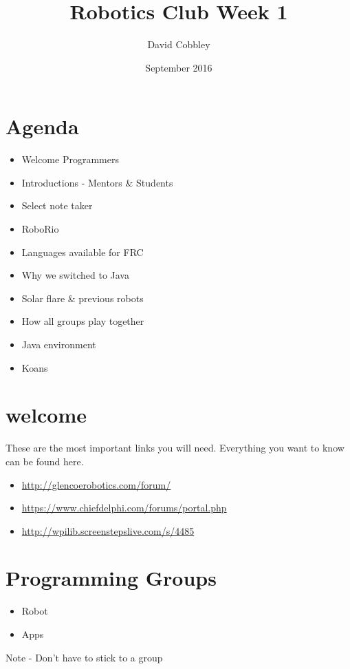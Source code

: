 \documentclass{article}
\title{Robotics Club Week 1}
\author{David Cobbley }
\date{September 2016}
\begin{document}
\maketitle

\section{Agenda}
\begin{itemize}
    
    \item Welcome Programmers
    \item Introductions - Mentors \& Students
    \item Select note taker
    \item RoboRio
    \item Languages available for FRC
    \item Why we switched to Java
    \item Solar flare \& previous robots
    \item How all groups play together
    \item Java environment
    \item Koans
\end{itemize}

\section{welcome}
These are the most important links you will need. Everything you want to know can be found here.
\begin{itemize}
    \item[] \url{http://glencoerobotics.com/forum/}
    \item[] \url{https://www.chiefdelphi.com/forums/portal.php}
    \item[] \url{http://wpilib.screenstepslive.com/s/4485}
\end{itemize}

\section{Programming Groups}
\begin{itemize}
    
    \item Robot
    \item Apps
\end{itemize}

{\footnotesize Note - Don't have to stick to a group\par}
\end{document}

